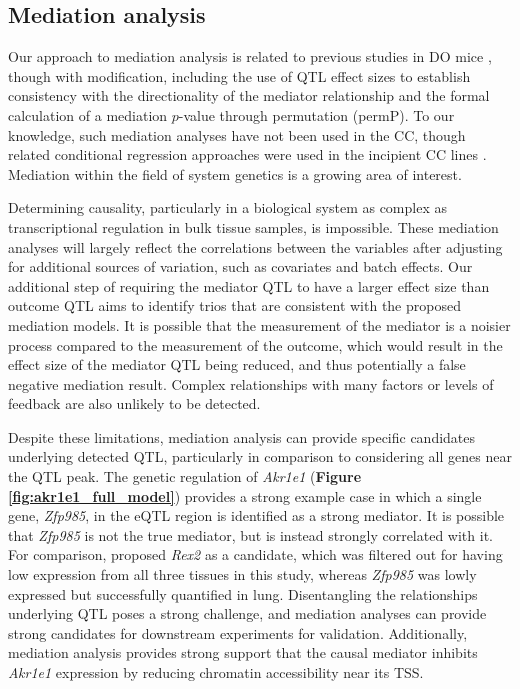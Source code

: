 \documentclass[9pt,twocolumn,twoside]{gsajnl}
\begin{document}
\subsection{Mediation analysis}

Our approach to mediation analysis is related to previous studies in DO mice \citep{Chick2016,Keller2018,Skelly2019}, though with modification, including the use of QTL effect sizes to establish consistency with the directionality of the mediator relationship and the formal calculation of a mediation $p$-value through permutation (permP).  To our knowledge, such mediation analyses have not been used in the CC, though related conditional regression approaches were used in the incipient CC lines \citep{Rutledge2014, Kelada2014}. Mediation within the field of system genetics is a growing area of interest.

Determining causality, particularly in a biological system as complex as transcriptional regulation in bulk tissue samples, is impossible. These mediation analyses will largely reflect the correlations between the variables after adjusting for additional sources of variation, such as covariates and batch effects. Our additional step of requiring the mediator QTL to have a larger effect size than outcome QTL aims to identify trios that are consistent with the proposed mediation models. It is possible that the measurement of the mediator is a noisier process compared to the measurement of the outcome, which would result in the effect size of the mediator QTL being reduced, and thus potentially a false negative mediation result. Complex relationships with many factors or levels of feedback are also unlikely to be detected.

Despite these limitations, mediation analysis can provide specific candidates underlying detected QTL, particularly in comparison to considering all genes near the QTL peak. The genetic regulation of \textit{Akr1e1} (\textbf{Figure \ref{fig:akr1e1_full_model}}) provides a strong example case in which a single gene, \textit{Zfp985}, in the eQTL region is identified as a strong mediator. It is possible that \textit{Zfp985} is not the true mediator, but is instead strongly correlated with it. For comparison, \cite{HamiltonWilliams2013} proposed \textit{Rex2} as a candidate, which was filtered out for having low expression from all three tissues in this study, whereas \textit{Zfp985} was lowly expressed but successfully quantified in lung. Disentangling the relationships underlying QTL poses a strong challenge, and mediation analyses can provide strong candidates for downstream experiments for validation. Additionally, mediation analysis provides strong support that the causal mediator inhibits \textit{Akr1e1} expression by reducing chromatin accessibility near its TSS.
\end{document}
